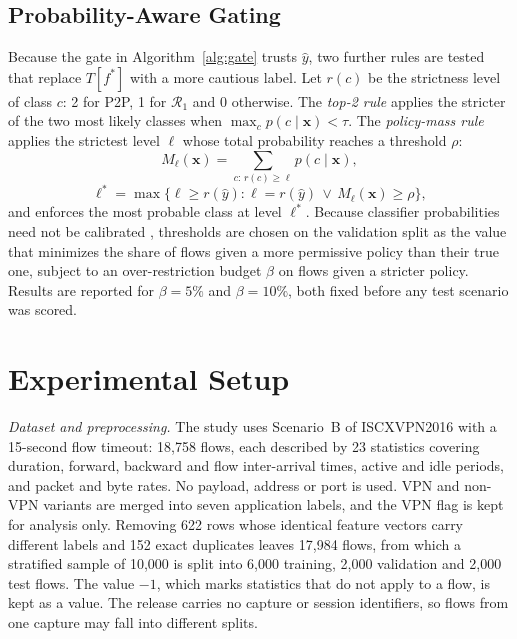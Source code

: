 \documentclass[conference,a4paper]{IEEEtran}
\begin{document}
\subsection{Probability-Aware Gating}
Because the gate in Algorithm~\ref{alg:gate} trusts $\hat{y}$, two further rules are tested that replace $T[f^{\ast}]$ with a more cautious label. Let $r(c)$ be the strictness level of class $c$: 2 for P2P, 1 for $\mathcal{R}_1$ and 0 otherwise. The \emph{top-2 rule} applies the stricter of the two most likely classes when $\max_c p(c \mid \mathbf{x}) < \tau$. The \emph{policy-mass rule} applies the strictest level $\ell$ whose total probability reaches a threshold $\rho$:
\begin{equation}
M_\ell(\mathbf{x}) = \sum_{c:\, r(c) \ge \ell} p(c \mid \mathbf{x}),
\end{equation}
\begin{equation}
\ell^{\ast} = \max\big\{\ell \ge r(\hat{y}) : \ell = r(\hat{y}) \,\vee\, M_\ell(\mathbf{x}) \ge \rho\big\},
\label{eq:mass}
\end{equation}
and enforces the most probable class at level $\ell^{\ast}$. Because classifier probabilities need not be calibrated \cite{guo2017calibration}, thresholds are chosen on the validation split as the value that minimizes the share of flows given a more permissive policy than their true one, subject to an over-restriction budget $\beta$ on flows given a stricter policy. Results are reported for $\beta = 5\%$ and $\beta = 10\%$, both fixed before any test scenario was scored.

\section{Experimental Setup}

\textit{Dataset and preprocessing.} The study uses Scenario~B of ISCXVPN2016 with a 15-second flow timeout: 18,758 flows, each described by 23 statistics covering duration, forward, backward and flow inter-arrival times, active and idle periods, and packet and byte rates. No payload, address or port is used. VPN and non-VPN variants are merged into seven application labels, and the VPN flag is kept for analysis only. Removing 622 rows whose identical feature vectors carry different labels and 152 exact duplicates leaves 17,984 flows, from which a stratified sample of 10,000 is split into 6,000 training, 2,000 validation and 2,000 test flows. The value $-1$, which marks statistics that do not apply to a flow, is kept as a value. The release carries no capture or session identifiers, so flows from one capture may fall into different splits.
\end{document}
